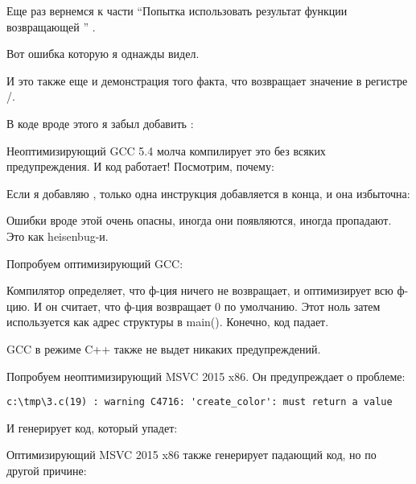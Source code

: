 \label{ForgottenReturn}

Еще раз вернемся к части ``Попытка использовать результат функции возвращающей \Tvoid'' .

Вот ошибка которую я однажды видел.

И это также еще и демонстрация того факта, что \CCpp возвращает значение в регистре \EAX/\RAX{}.

В коде вроде этого я забыл добавить :



Неоптимизирующий GCC 5.4 молча компилирует это без всяких предупреждения.
И код работает!
Посмотрим, почему:



Если я добавляю , только одна инструкция добавляется в конца, и она избыточна:



Ошибки вроде этой очень опасны, иногда они появляются, иногда пропадают.
Это как heisenbug-и.

Попробуем оптимизирующий GCC:



Компилятор определяет, что ф-ция ничего не возвращает, и оптимизирует всю ф-цию.
И он считает, что ф-ция возвращает 0 по умолчанию. Этот ноль затем используется как адрес структуры в main().
Конечно, код падает.

GCC в режиме C++ также не выдет никаких предупреждений.

Попробуем неоптимизирующий MSVC 2015 x86.
Он предупреждает о проблеме:

\begin{lstlisting}
c:\tmp\3.c(19) : warning C4716: 'create_color': must return a value                                                               
\end{lstlisting}

И генерирует код, который упадет:



Оптимизирующий MSVC 2015 x86 также генерирует падающий код, но по другой причине:

